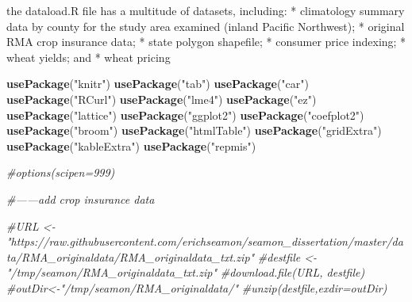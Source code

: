 \documentclass[]{article}
\newenvironment{Shaded}{\begin{snugshade}}{\end{snugshade}}
\newcommand{\CommentTok}[1]{\textcolor[rgb]{0.56,0.35,0.01}{\textit{#1}}}
\newcommand{\KeywordTok}[1]{\textcolor[rgb]{0.13,0.29,0.53}{\textbf{#1}}}
\newcommand{\NormalTok}[1]{#1}
\newcommand{\StringTok}[1]{\textcolor[rgb]{0.31,0.60,0.02}{#1}}
\begin{document}
the dataload.R file has a multitude of datasets, including: *
climatology summary data by county for the study area examined (inland
Pacific Northwest); * original RMA crop insurance data; * state polygon
shapefile; * consumer price indexing; * wheat yields; and * wheat
pricing

\begin{Shaded}
\begin{Highlighting}[]
\KeywordTok{usePackage}\NormalTok{(}\StringTok{"knitr"}\NormalTok{)}
\KeywordTok{usePackage}\NormalTok{(}\StringTok{"tab"}\NormalTok{)}
\KeywordTok{usePackage}\NormalTok{(}\StringTok{"car"}\NormalTok{)}
\KeywordTok{usePackage}\NormalTok{(}\StringTok{"RCurl"}\NormalTok{)}
\KeywordTok{usePackage}\NormalTok{(}\StringTok{"lme4"}\NormalTok{)}
\KeywordTok{usePackage}\NormalTok{(}\StringTok{"ez"}\NormalTok{)}
\KeywordTok{usePackage}\NormalTok{(}\StringTok{"lattice"}\NormalTok{)}
\KeywordTok{usePackage}\NormalTok{(}\StringTok{"ggplot2"}\NormalTok{)}
\KeywordTok{usePackage}\NormalTok{(}\StringTok{"coefplot2"}\NormalTok{)}
\KeywordTok{usePackage}\NormalTok{(}\StringTok{"broom"}\NormalTok{)}
\KeywordTok{usePackage}\NormalTok{(}\StringTok{"htmlTable"}\NormalTok{)}
\KeywordTok{usePackage}\NormalTok{(}\StringTok{"gridExtra"}\NormalTok{)}
\KeywordTok{usePackage}\NormalTok{(}\StringTok{"kableExtra"}\NormalTok{)}
\KeywordTok{usePackage}\NormalTok{(}\StringTok{"repmis"}\NormalTok{)}



\CommentTok{#options(scipen=999)}


\CommentTok{#------add crop insurance data}

\CommentTok{#URL <- "https://raw.githubusercontent.com/erichseamon/seamon_dissertation/master/data/RMA_originaldata/RMA_originaldata_txt.zip"}
\CommentTok{#destfile <- "/tmp/seamon/RMA_originaldata_txt.zip"}
\CommentTok{#download.file(URL, destfile)}
\CommentTok{#outDir<-"/tmp/seamon/RMA_originaldata/"}
\CommentTok{#unzip(destfile,exdir=outDir)}



\end{Highlighting}
\end{Shaded}
\end{document}
